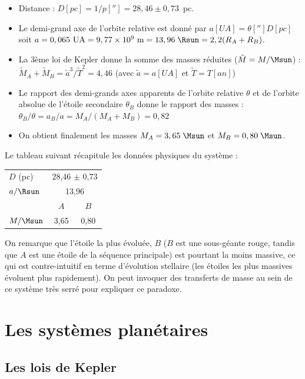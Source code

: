 \documentclass[a4paper,10pt]{report}
\newcommand{\e}[1]{\ensuremath{\times 10^{#1}}}
\renewcommand{\u}[1]{\si{#1}} %
\begin{document}
\begin{Answer}
  \begin{itemize}
  \item Distance : $D [\u{pc}] = 1/p[''] = 28,46 \pm 0,73$~pc.
  \item Le demi-grand axe de l'orbite relative est donné par $a
    [\u{UA}] = \theta [''] D [\u{pc}]$ soit $a = 0,065~\u{UA} =
    9,77\e{9}~\u{m} = 13,96\;\Rsun = 2,2 (R_{A}+R_{B})$.
  \item La 3ème loi de Kepler donne la somme des masses réduites
    ($\tilde{M} = M/\Msun$) : $\tilde{M}_A + \tilde{M}_B =
    \tilde{a}^3/\tilde{T}^2 = 4,46$ (avec $\tilde{a} = a[\u{UA}]$ et
    $\tilde{T} = T[\u{an}]$)
  \item Le rapport des demi-grands axes apparents de l'orbite relative
    $\theta$ et de l'orbite absolue de l'étoile secondaire $\theta_B$
    donne le rapport des masses : $\theta_B / \theta = a_B / a = M_A /
    (M_A + M_B) = 0,82$
  \item On obtient finalement les masses $M_A = 3,65\;\Msun$ et $M_B =
    0,80\;\Msun$.
  \end{itemize}
  Le tableau suivant récapitule les données physiques du système :
  \begin{center}
    \begin{tabular}{lcc}
      \toprule
      $D$ (pc) & \multicolumn{2}{c}{28,46 $\pm$ 0,73} \\
      $a/\Rsun$ & \multicolumn{2}{c}{13,96} \\
      \midrule
      & $A$ & $B$ \\
      \cmidrule(r){2-3}
      $M/\Msun$ & 3,65 & 0,80 \\
      \bottomrule
    \end{tabular}
  \end{center}
  On remarque que l'étoile la plus évoluée, $B$ ($B$ est une
  sous-géante rouge, tandis que $A$ est une étoile de la séquence
  principale) est pourtant la moins massive, ce qui est
  contre-intuitif en terme d'évolution stellaire (les étoiles les plus
  massives évoluent plus rapidement). On peut invoquer des transferts
  de masse au sein de ce système très serré pour expliquer ce
  paradoxe.
\end{Answer}

\section{Les systèmes planétaires}

\subsection{Les lois de Kepler}
\end{document}
